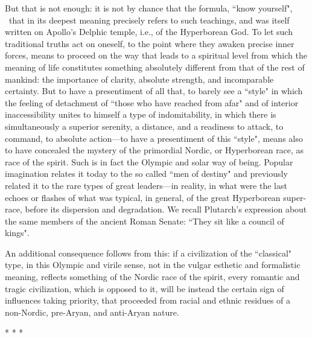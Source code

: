 But that is not enough: it is not by chance that the formula, ``know yourself",  that in its deepest meaning precisely refers to such teachings, and was itself written on Apollo's Delphic temple, i.e., of the Hyperborean God. To let such traditional truths act on oneself, to the point where they awaken precise inner forces, means to proceed on the way that leads to a spiritual level from which the meaning of life constitutes something absolutely different from that of the rest of mankind: the importance of clarity, absolute strength, and incomparable certainty. But to have a presentiment of all that, to barely see a ``style" in which the feeling of detachment of ``those who have reached from afar" and of interior inaccessibility unites to himself a type of indomitability, in which there is simultaneously a superior serenity, a distance, and a readiness to attack, to command, to absolute action—to have a presentiment of this ``style", means also to have concealed the mystery of the primordial Nordic, or Hyperborean race, as race of the spirit. Such is in fact the Olympic and solar way of being. Popular imagination relates it today to the so called ``men of destiny" and previously related it to the rare types of great leaders—in reality, in what were the last echoes or flashes of what was typical, in general, of the great Hyperborean super-race, before its dispersion and degradation. We recall Plutarch's expression about the same members of the ancient Roman Senate: ``They sit like a council of kings".

An additional consequence follows from this: if a civilization of the ``classical" type, in this Olympic and virile sense, not in the vulgar esthetic and formalistic meaning, reflects something of the Nordic race of the spirit, every romantic and tragic civilization, which is opposed to it, will be instead the certain sign of influences taking priority, that proceeded from racial and ethnic residues of a non-Nordic, pre-Aryan, and anti-Aryan nature.




\begin{center}* * *\end{center}


